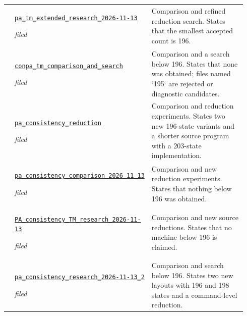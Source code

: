 {\begin{longtable}{@{}>{\raggedright\arraybackslash}p{0.035\linewidth}>{\raggedright\arraybackslash}p{0.345\linewidth}>{\raggedright\arraybackslash}p{0.56\linewidth}@{}}
18 & \href{https://github.com/VladimirReshetnikov/ProveIt/blob/1c9524d8bf2e0a27b9a16ff622359927f536e663/Computability/BusyBeaver/Research/PA/docs/pa_tm_extended_research_2026-11-13/README.md}{\nolinkurl{pa_tm_extended_research_2026-11-13}}\par\emph{filed} & Comparison and refined reduction search. States that the smallest accepted count is 196.\\[4pt]
19 & \href{https://github.com/VladimirReshetnikov/ProveIt/blob/1c9524d8bf2e0a27b9a16ff622359927f536e663/Computability/BusyBeaver/Research/PA/docs/conpa_tm_comparison_and_search/README.md}{\nolinkurl{conpa_tm_comparison_and_search}}\par\emph{filed} & Comparison and a search below 196. States that none was obtained; files named `195` are rejected or diagnostic candidates.\\[4pt]
20 & \href{https://github.com/VladimirReshetnikov/ProveIt/blob/1c9524d8bf2e0a27b9a16ff622359927f536e663/Computability/BusyBeaver/Research/PA/docs/pa_consistency_reduction/README.md}{\nolinkurl{pa_consistency_reduction}}\par\emph{filed} & Comparison and reduction experiments. States two new 196-state variants and a shorter source program with a 203-state implementation.\\[4pt]
21 & \href{https://github.com/VladimirReshetnikov/ProveIt/blob/1c9524d8bf2e0a27b9a16ff622359927f536e663/Computability/BusyBeaver/Research/PA/docs/pa_consistency_comparison_2026_11_13/README.md}{\nolinkurl{pa_consistency_comparison_2026_11_13}}\par\emph{filed} & Comparison and new reduction experiments. States that nothing below 196 was obtained.\\[4pt]
22 & \href{https://github.com/VladimirReshetnikov/ProveIt/blob/1c9524d8bf2e0a27b9a16ff622359927f536e663/Computability/BusyBeaver/Research/PA/docs/PA_consistency_TM_research_2026-11-13/README.txt}{\nolinkurl{PA_consistency_TM_research_2026-11-13}}\par\emph{filed} & Comparison and new source reductions. States that no machine below 196 is claimed.\\[4pt]
23 & \href{https://github.com/VladimirReshetnikov/ProveIt/blob/1c9524d8bf2e0a27b9a16ff622359927f536e663/Computability/BusyBeaver/Research/PA/docs/pa_consistency_research_2026-11-13_2/README.md}{\nolinkurl{pa_consistency_research_2026-11-13_2}}\par\emph{filed} & Comparison and search below 196. States two new layouts with 196 and 198 states and a command-level reduction.\\[4pt]

\end{longtable}}
